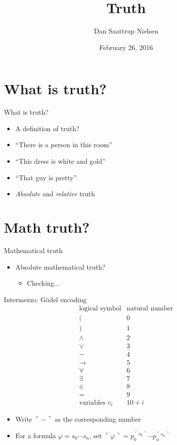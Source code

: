 \documentclass{beamer}
\title[Truth]{Truth}
\author{Dan Saattrup Nielsen}
\date{February 26, 2016}
\newcommand{\godel}[1]{\ulcorner #1 \urcorner}
\begin{document}
\begin{frame}
  \titlepage
\end{frame}


\section{What is truth?}
\begin{frame}{What is truth?}
  \begin{itemize}
    \item A definition of truth?\pause
    \item ``There is a person in this room''\pause
    \item ``This dress is white and gold''\pause
    \item ``That guy is pretty''\pause
    \item \textit{Absolute} and \textit{relative} truth
  \end{itemize}
\end{frame}

\section{Math truth?}
\begin{frame}{Mathematical truth}
  \begin{itemize}
    \item Absolute mathematical truth?\pause
    \begin{itemize}
      \item Checking...
    \end{itemize}
  \end{itemize}
\end{frame}

\begin{frame}{Intermezzo: Gödel encoding}
  \pause
  $$\begin{array}{c|c}
    \text{logical symbol} & \text{natural number}\\\hline
    ( & 0\\
    ) & 1\\
    \land & 2\\
    \lor & 3\\
    \lnot & 4\\
    \to & 5\\
    \forall & 6\\
    \exists & 7\\
    \in & 8\\
    = & 9\\
    \text{variables } v_i & 10+i
  \end{array}$$

  \begin{itemize}
    \pause\item Write $\godel{-}$ as the corresponding number
    \pause\item For a formula $\varphi=s_0\cdots s_n$, set $\godel{\varphi}=p_0^{\godel{s_0}}\cdots p_n^{\godel{s_n}}$
  \end{itemize}

\end{frame}
\end{document}
